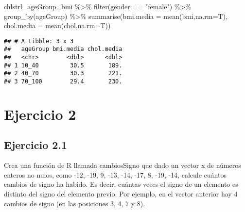 \documentclass[
]{article}
\newenvironment{Shaded}{\begin{snugshade}}{\end{snugshade}}
\newcommand{\AttributeTok}[1]{\textcolor[rgb]{0.77,0.63,0.00}{#1}}
\newcommand{\FunctionTok}[1]{\textcolor[rgb]{0.00,0.00,0.00}{#1}}
\newcommand{\NormalTok}[1]{#1}
\newcommand{\SpecialCharTok}[1]{\textcolor[rgb]{0.00,0.00,0.00}{#1}}
\newcommand{\StringTok}[1]{\textcolor[rgb]{0.31,0.60,0.02}{#1}}
\begin{document}
\begin{Shaded}
\begin{Highlighting}[]
\NormalTok{chlstrl\_ageGroup\_bmi }\SpecialCharTok{\%\textgreater{}\%} 
  \FunctionTok{filter}\NormalTok{(gender }\SpecialCharTok{==} \StringTok{"female"}\NormalTok{) }\SpecialCharTok{\%\textgreater{}\%} 
  \FunctionTok{group\_by}\NormalTok{(ageGroup) }\SpecialCharTok{\%\textgreater{}\%} 
    \FunctionTok{summarise}\NormalTok{(}\AttributeTok{bmi.media =} \FunctionTok{mean}\NormalTok{(bmi,}\AttributeTok{na.rm=}\NormalTok{T),}
            \AttributeTok{chol.media =} \FunctionTok{mean}\NormalTok{(chol,}\AttributeTok{na.rm=}\NormalTok{T))}
\end{Highlighting}
\end{Shaded}

\begin{verbatim}
## # A tibble: 3 x 3
##   ageGroup bmi.media chol.media
##   <chr>        <dbl>      <dbl>
## 1 10_40         30.5       189.
## 2 40_70         30.3       221.
## 3 70_100        29.4       230.
\end{verbatim}

\hypertarget{ejercicio-2}{%
\section{Ejercicio 2}\label{ejercicio-2}}

\hypertarget{ejercicio-2.1}{%
\subsection{Ejercicio 2.1}\label{ejercicio-2.1}}

Crea una función de R llamada cambiosSigno que dado un vector x de
números enteros no nulos, como -12, -19, 9, -13, -14, -17, 8, -19, -14,
calcule cuántos cambios de signo ha habido. Es decir, cuántas veces el
signo de un elemento es distinto del signo del elemento previo. Por
ejemplo, en el vector anterior hay 4 cambios de signo (en las posiciones
3, 4, 7 y 8).
\end{document}
